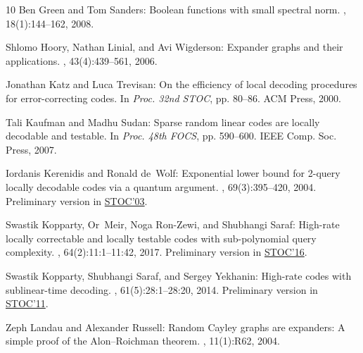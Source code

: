 \documentclass[11pt]{article}
\numberwithin{equation}{section}
\theoremstyle{definition}
\theoremstyle{plain}
\begin{document}
\begin{thebibliography}{10}
{\sc Ben Green and Tom Sanders}: Boolean functions with small spectral norm.
, 18(1):144--162, 2008.

{\sc Shlomo Hoory, Nathan Linial, and Avi Wigderson}: Expander graphs and their
  applications.
, 43(4):439--561, 2006.
\newblock [\epfmtdoi{10.1090/S0273-0979-06-01126-8}]

{\sc Jonathan Katz and Luca Trevisan}: On the efficiency of local decoding
  procedures for error-correcting codes.
\newblock In {\em Proc. 32nd STOC}, pp. 80--86. ACM Press, 2000.
\newblock [\epfmtdoi{10.1145/335305.335315}]

{\sc Tali Kaufman and Madhu Sudan}: Sparse random linear codes are locally
  decodable and testable.
\newblock In {\em Proc. 48th FOCS}, pp. 590--600. IEEE Comp. Soc. Press, 2007.

{\sc Iordanis Kerenidis and Ronald de~Wolf}: Exponential lower bound for
  2-query locally decodable codes via a quantum argument.
, 69(3):395--420, 2004.
\newblock Preliminary version in
  \href{https://dl.acm.org/citation.cfm?id=780560}{STOC'03}.

{\sc Swastik Kopparty, Or~Meir, Noga Ron-Zewi, and Shubhangi Saraf}: High-rate
  locally correctable and locally testable codes with sub-polynomial query
  complexity.
, 64(2):11:1--11:42, 2017.
\newblock Preliminary version in
  \href{https://dl.acm.org/citation.cfm?id=2897523}{STOC'16}.

{\sc Swastik Kopparty, Shubhangi Saraf, and Sergey Yekhanin}: High-rate codes
  with sublinear-time decoding.
, 61(5):28:1--28:20, 2014.
\newblock Preliminary version in
  \href{https://doi.org/10.1145/1993636.1993660}{STOC'11}.
\newblock [\epfmtdoi{10.1145/2629416}]

{\sc Zeph Landau and Alexander Russell}: Random {C}ayley graphs are expanders:
  {A} simple proof of the {A}lon--{R}oichman theorem.
, 11(1):R62, 2004.


\end{thebibliography}
\end{document}
